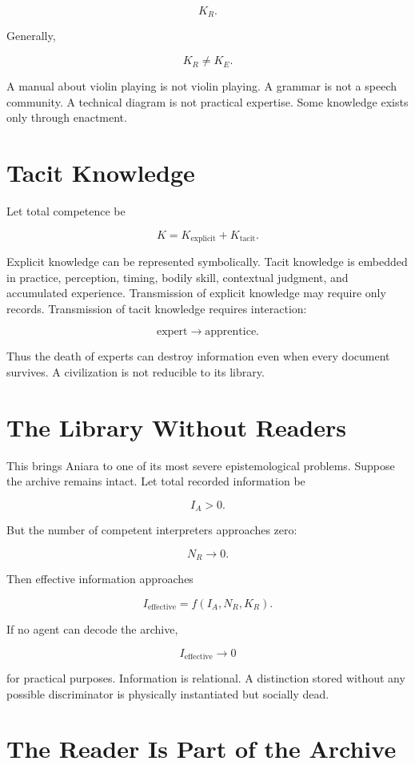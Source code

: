 \documentclass[11pt,oneside]{book}
\theoremstyle{definition}
\theoremstyle{remark}
\begin{document}
\[
K_R.
\]

Generally,

\[
K_R\neq K_E.
\]

A manual about violin playing is not violin playing. A grammar is not a speech community. A
technical diagram is not practical expertise. Some knowledge exists only through enactment.

\section{Tacit Knowledge}

Let total competence be

\[
K = K_{\mathrm{explicit}} + K_{\mathrm{tacit}}.
\]

Explicit knowledge can be represented symbolically. Tacit knowledge is embedded in practice,
perception, timing, bodily skill, contextual judgment, and accumulated experience. Transmission of
explicit knowledge may require only records. Transmission of tacit knowledge requires interaction:

\[
\text{expert} \rightarrow \text{apprentice}.
\]

Thus the death of experts can destroy information even when every document survives. A civilization
is not reducible to its library.

\section{The Library Without Readers}

This brings Aniara to one of its most severe epistemological problems. Suppose the archive remains
intact. Let total recorded information be

\[
I_A>0.
\]

But the number of competent interpreters approaches zero:

\[
N_R\rightarrow0.
\]

Then effective information approaches

\[
I_{\mathrm{effective}} = f(I_A,N_R,K_R).
\]

If no agent can decode the archive,

\[
I_{\mathrm{effective}}\rightarrow0
\]

for practical purposes. Information is relational. A distinction stored without any possible
discriminator is physically instantiated but socially dead.

\section{The Reader Is Part of the Archive}
\end{document}
